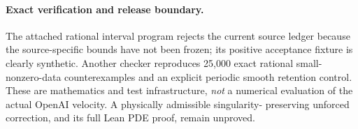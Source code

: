 \paragraph{Exact verification and release boundary.}
The attached rational interval program rejects the current
source ledger because the source-specific bounds have not
been frozen; its positive acceptance fixture is clearly
synthetic. Another checker reproduces 25,000 exact rational
small-nonzero-data counterexamples and an explicit periodic
smooth retention control. These are mathematics and test
infrastructure, \emph{not} a numerical evaluation of the
actual OpenAI velocity. A physically admissible singularity-
preserving unforced correction, and its full Lean PDE proof,
remain unproved.
